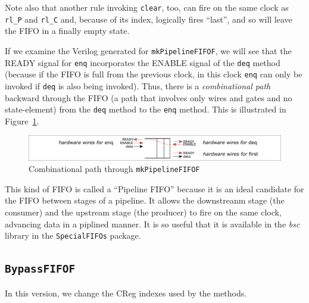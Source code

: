 Note also that another rule invoking \verb|clear|, too, can fire on
the same clock as \verb|rl_P| and \verb|rl_C| and, because of its
index, logically fires ``last'', and so will leave the FIFO in a
finally empty state.

If we examine the Verilog generated for \verb|mkPipelineFIFOF|, we
will see that the READY signal for \verb|enq| incorporates the ENABLE
signal of the \verb|deq| method (because if the FIFO is full from the
previous clock, in this clock \verb|enq| can only be invoked if
\verb|deq| is also being invoked).  Thus, there is a
\emph{combinational path} backward through the FIFO (a path that
involves only wires and gates and no state-element) from the
\verb|deq| method to the \verb|enq| method.  This is illustrated in
Figure~\ref{Fig_Combo_path_in_mkPipelineFIFOF}.
\begin{figure}[htbp]
  \centerline{\includegraphics[width=6in,angle=0]{Figures/Fig_Combo_path_in_mkPipelineFIFOF}}
  \caption{\label{Fig_Combo_path_in_mkPipelineFIFOF}
           Combinational path through {\tt mkPipelineFIFOF}}
\end{figure}

This kind of FIFO is called a ``Pipeline FIFO'' because it is an ideal
candidate for the FIFO between stages of a pipeline.  It allows the
downstreanm stage (the consumer) and the upstream stage (the producer)
to fire on the same clock, advancing data in a piplined manner.  It is
so useful that it is available in the \emph{bsc} library in the
\verb|SpecialFIFOs| package.


\subsection{{\tt BypassFIFOF}}

In this version, we change the CReg indexes used by the methods.

